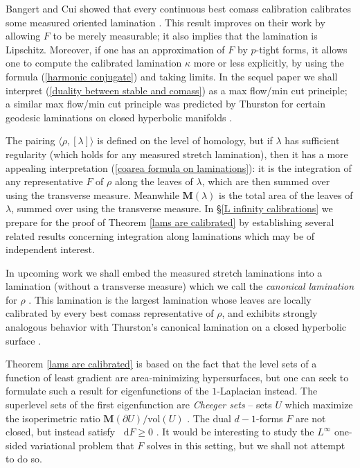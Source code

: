\documentclass[reqno,11pt]{amsart}
\newcommand*\dif{\mathop{}\!\mathrm{d}}
\newcommand{\vol}{\mathrm{vol}}
\newcommand{\Mass}{\mathbf M}
\newcommand{\dfn}[1]{\emph{#1}\index{#1}}
\theoremstyle{definition}
\numberwithin{equation}{section}
\begin{document}
Bangert and Cui showed that every continuous best comass calibration calibrates some measured oriented lamination \cite{bangert_cui_2017}.
This result improves on their work by allowing $F$ to be merely measurable; it also implies that the lamination is Lipschitz.
Moreover, if one has an approximation of $F$ by $p$-tight forms, it allows one to compute the calibrated lamination $\kappa$ more or less explicitly, by using the formula (\ref{harmonic conjugate}) and taking limits.
In the sequel paper \cite{BackusBest2} we shall interpret (\ref{duality between stable and comass}) as a max flow/min cut principle; a similar max flow/min cut principle was predicted by Thurston for certain geodesic laminations on closed hyperbolic manifolds \cite{Thurston98}.

The pairing $\langle \rho, [\lambda]\rangle$ is defined on the level of homology, but if $\lambda$ has sufficient regularity (which holds for any measured stretch lamination), then it has a more appealing interpretation (\ref{coarea formula on laminations}): it is the integration of any representative $F$ of $\rho$ along the leaves of $\lambda$, which are then summed over using the transverse measure.
Meanwhile $\Mass(\lambda)$ is the total area of the leaves of $\lambda$, summed over using the transverse measure.
In \S\ref{L infinity calibrations} we prepare for the proof of Theorem \ref{lams are calibrated} by establishing several related results concerning integration along laminations which may be of independent interest.

In upcoming work we shall embed the measured stretch laminations into a lamination (without a transverse measure) which we call the \dfn{canonical lamination} for $\rho$ \cite{BackusBest2}.
This lamination is the largest lamination whose leaves are locally calibrated by every best comass representative of $\rho$, and exhibits strongly analogous behavior with Thurston's canonical lamination on a closed hyperbolic surface \cite{Thurston98}.

Theorem \ref{lams are calibrated} is based on the fact that the level sets of a function of least gradient are area-minimizing hypersurfaces, but one can seek to formulate such a result for eigenfunctions of the $1$-Laplacian instead.
The superlevel sets of the first eigenfunction are \dfn{Cheeger sets} -- sets $U$ which maximize the isoperimetric ratio $\Mass(\partial U)/\vol(U)$ \cite{Kawohl2003}.
The dual $d - 1$-forms $F$ are not closed, but instead satisfy $\dif F \geq 0$ \cite{Grieser05}.
It would be interesting to study the $L^\infty$ one-sided variational problem that $F$ solves in this setting, but we shall not attempt to do so.
\end{document}
